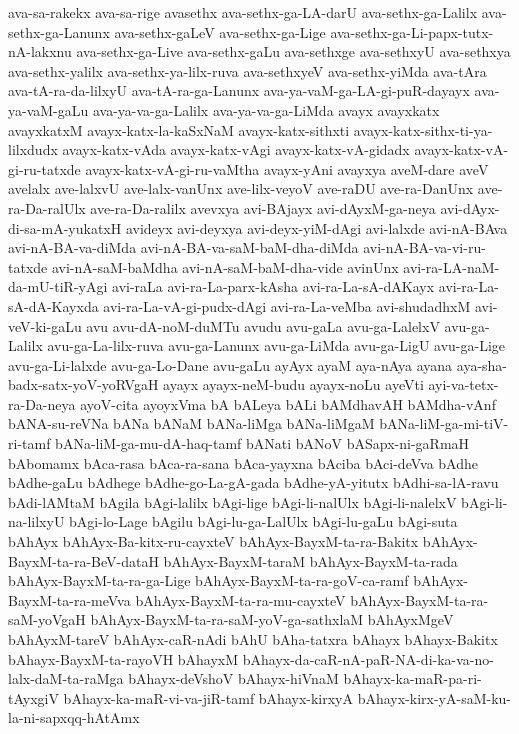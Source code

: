 {ava-sa-rakekx
ava-sa-rige
avasethx
ava-sethx-ga-LA-darU
ava-sethx-ga-Lalilx
ava-sethx-ga-Lanunx
ava-sethx-gaLeV
ava-sethx-ga-Lige
ava-sethx-ga-Li-papx-tutx-nA-lakxnu
ava-sethx-ga-Live
ava-sethx-gaLu
ava-sethxge
ava-sethxyU
ava-sethxya
ava-sethx-yalilx
ava-sethx-ya-lilx-ruva
ava-sethxyeV
ava-sethx-yiMda
ava-tAra
ava-tA-ra-da-lilxyU
ava-tA-ra-ga-Lanunx
ava-ya-vaM-ga-LA-gi-puR-dayayx
ava-ya-vaM-gaLu
ava-ya-va-ga-Lalilx
ava-ya-va-ga-LiMda
avayx
avayxkatx
avayxkatxM
avayx-katx-la-kaSxNaM
avayx-katx-sithxti
avayx-katx-sithx-ti-ya-lilxdudx
avayx-katx-vAda
avayx-katx-vAgi
avayx-katx-vA-gidadx
avayx-katx-vA-gi-ru-tatxde
avayx-katx-vA-gi-ru-vaMtha
avayx-yAni
avayxya
aveM-dare
aveV
avelalx
ave-lalxvU
ave-lalx-vanUnx
ave-lilx-veyoV
ave-raDU
ave-ra-DanUnx
ave-ra-Da-ralUlx
ave-ra-Da-ralilx
avevxya
avi-BAjayx
avi-dAyxM-ga-neya
avi-dAyx-di-sa-mA-yukatxH
avideyx
avi-deyxya
avi-deyx-yiM-dAgi
avi-lalxde
avi-nA-BAva
avi-nA-BA-va-diMda
avi-nA-BA-va-saM-baM-dha-diMda
avi-nA-BA-va-vi-ru-tatxde
avi-nA-saM-baMdha
avi-nA-saM-baM-dha-vide
avinUnx
avi-ra-LA-naM-da-mU-tiR-yAgi
avi-raLa
avi-ra-La-parx-kAsha
avi-ra-La-sA-dAKayx
avi-ra-La-sA-dA-Kayxda
avi-ra-La-vA-gi-pudx-dAgi
avi-ra-La-veMba
avi-shudadhxM
avi-veV-ki-gaLu
avu
avu-dA-noM-duMTu
avudu
avu-gaLa
avu-ga-LalelxV
avu-ga-Lalilx
avu-ga-La-lilx-ruva
avu-ga-Lanunx
avu-ga-LiMda
avu-ga-LigU
avu-ga-Lige
avu-ga-Li-lalxde
avu-ga-Lo-Dane
avu-gaLu
ayAyx
ayaM
aya-nAya
ayana
aya-sha-badx-satx-yoV-yoRVgaH
ayayx
ayayx-neM-budu
ayayx-noLu
ayeVti
ayi-va-tetx-ra-Da-neya
ayoV-cita
ayoyxVma
bA
bALeya
bALi
bAMdhavAH
bAMdha-vAnf
bANA-su-reVNa
bANa
bANaM
bANa-liMga
bANa-liMgaM
bANa-liM-ga-mi-tiV-ri-tamf
bANa-liM-ga-mu-dA-haq-tamf
bANati
bANoV
bASapx-ni-gaRmaH
bAbomamx
bAca-rasa
bAca-ra-sana
bAca-yayxna
bAciba
bAci-deVva
bAdhe
bAdhe-gaLu
bAdhege
bAdhe-go-La-gA-gada
bAdhe-yA-yitutx
bAdhi-sa-lA-ravu
bAdi-lAMtaM
bAgila
bAgi-lalilx
bAgi-lige
bAgi-li-nalUlx
bAgi-li-nalelxV
bAgi-li-na-lilxyU
bAgi-lo-Lage
bAgilu
bAgi-lu-ga-LalUlx
bAgi-lu-gaLu
bAgi-suta
bAhAyx
bAhAyx-Ba-kitx-ru-cayxteV
bAhAyx-BayxM-ta-ra-Bakitx
bAhAyx-BayxM-ta-ra-BeV-dataH
bAhAyx-BayxM-taraM
bAhAyx-BayxM-ta-rada
bAhAyx-BayxM-ta-ra-ga-Lige
bAhAyx-BayxM-ta-ra-goV-ca-ramf
bAhAyx-BayxM-ta-ra-meVva
bAhAyx-BayxM-ta-ra-mu-cayxteV
bAhAyx-BayxM-ta-ra-saM-yoVgaH
bAhAyx-BayxM-ta-ra-saM-yoV-ga-sathxlaM
bAhAyxMgeV
bAhAyxM-tareV
bAhAyx-caR-nAdi
bAhU
bAha-tatxra
bAhayx
bAhayx-Bakitx
bAhayx-BayxM-ta-rayoVH
bAhayxM
bAhayx-da-caR-nA-paR-NA-di-ka-va-no-lalx-daM-ta-raMga
bAhayx-deVshoV
bAhayx-hiVnaM
bAhayx-ka-maR-pa-ri-tAyxgiV
bAhayx-ka-maR-vi-va-jiR-tamf
bAhayx-kirxyA
bAhayx-kirx-yA-saM-ku-la-ni-sapxqq-hAtAmx
}
